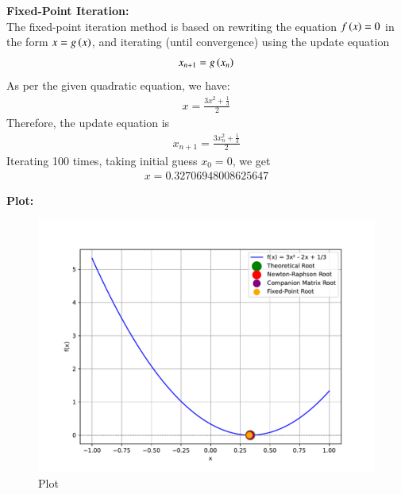 \documentclass[journal]{IEEEtran}
\begin{document}
\textbf{Fixed-Point Iteration:}\\
The fixed-point iteration method is based on rewriting the equation $f\left(x\right)=0$ in the form $x=g\left(x\right)$, and iterating (until convergence) using the update equation
\begin{align}
    x_{n+1} = g\left(x_n\right)
\end{align}
As per the given quadratic equation, we have:
\begin{align}
    x = \frac{3x^2 + \frac{1}{3}}{2}
\end{align}
Therefore, the update equation is
\begin{align}
    x_{n+1} = \frac{3x_n^2 + \frac{1}{3}}{2}
\end{align}
Iterating 100 times, taking initial guess $x_0 = 0$, we get
\begin{align}
    x = 0.32706948008625647
\end{align}

\newpage

\textbf{Plot:}
\begin{figure}[h]
	\centering
	\includegraphics[width=\columnwidth]{figs/fig.pdf}
	\caption{Plot}
\end{figure}
\end{document}
